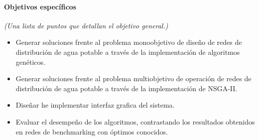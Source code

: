 \documentclass[11pt,letterpaper]{article}
\begin{document}
\paragraph{Objetivos específicos} \emph{(Una lista de puntos que detallan el objetivo general.)}
\begin{itemize}
\item Generar soluciones frente al problema monoobjetivo de diseño de redes de distribución de agua potable a través de la implementación de algoritmos genéticos.
\item Generar soluciones frente al problema multiobjetivo de operación de redes de distribución de agua potable a través de la implementación de NSGA-II.
\item Diseñar he implementar interfaz grafica del sistema. 
\item Evaluar el desempeño de los algoritmos, contrastando los resultados obtenidos en redes de benchmarking con óptimos conocidos.

\end{itemize}
\end{document}
